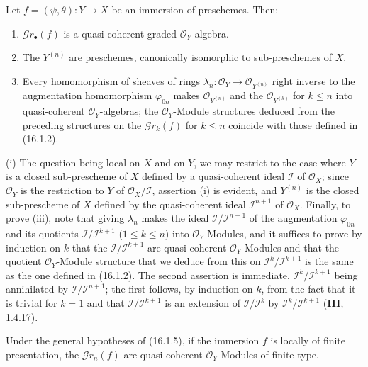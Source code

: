 \begin{proposition}[16.1.5]\label{IV.16.1.5}
Let $f=(\psi,\theta):Y\to X$ be an immersion of preschemes. Then:
\begin{enumerate}
\item[\textup{(i)}] $\mathscr{G}r_\bullet(f)$ is a quasi-coherent graded
$\mathcal{O}_Y$-algebra.
\item[\textup{(ii)}] The $Y^{(n)}$ are preschemes, canonically isomorphic to
sub-preschemes of $X$.
\item[\textup{(iii)}] Every homomorphism of sheaves of rings
$\lambda_n:\mathcal{O}_Y\to\mathcal{O}_{Y^{(n)}}$ right inverse to
the augmentation homomorphism $\varphi_{0n}$ makes
$\mathcal{O}_{Y^{(n)}}$ and the $\mathcal{O}_{Y^{(k)}}$ for $k\leq n$ into
quasi-coherent $\mathcal{O}_Y$-algebras; the
$\mathcal{O}_Y$-Module structures deduced from the preceding structures on the
$\mathscr{G}r_k(f)$ for $k\leq n$ coincide with those defined in
(16.1.2).
\end{enumerate}
\end{proposition}

\noindent(i) The question being local on $X$ and on $Y$, we may restrict to the case
where $Y$ is a closed sub-prescheme of $X$ defined by a quasi-coherent ideal
$\mathscr{I}$ of $\mathcal{O}_X$; since $\mathcal{O}_Y$ is the restriction to
$Y$ of $\mathcal{O}_X/\mathscr{I}$, assertion (i) is evident, and $Y^{(n)}$
is the closed sub-prescheme of $X$ defined by the quasi-coherent ideal
$\mathscr{I}^{n+1}$ of $\mathcal{O}_X$. Finally, to prove (iii), note that
giving $\lambda_n$ makes the ideal
$\mathscr{I}/\mathscr{I}^{n+1}$ of the augmentation $\varphi_{0n}$ and its
quotients $\mathscr{I}/\mathscr{I}^{k+1}$ ($1\leq k\leq n$) into
$\mathcal{O}_Y$-Modules, and it suffices to prove by induction on $k$ that the
$\mathscr{I}/\mathscr{I}^{k+1}$ are quasi-coherent $\mathcal{O}_Y$-Modules
and that the quotient $\mathcal{O}_Y$-Module structure that we
deduce from this on $\mathscr{I}^k/\mathscr{I}^{k+1}$ is the same as the one defined in
(16.1.2). The second assertion is immediate,
$\mathscr{I}^k/\mathscr{I}^{k+1}$ being annihilated by
$\mathscr{I}/\mathscr{I}^{n+1}$; the first follows, by induction on $k$,
from the fact that it is trivial for $k=1$ and that
$\mathscr{I}/\mathscr{I}^{k+1}$ is an extension of
$\mathscr{I}/\mathscr{I}^k$ by
$\mathscr{I}^k/\mathscr{I}^{k+1}$ (\textbf{III}, 1.4.17).

\begin{corollary}[16.1.6]
\label{IV.16.1.6}
Under the general hypotheses of (16.1.5), if the immersion $f$ is locally of
finite presentation, the $\mathscr{G}r_n(f)$ are quasi-coherent
$\mathcal{O}_Y$-Modules of finite type.
\end{corollary}

